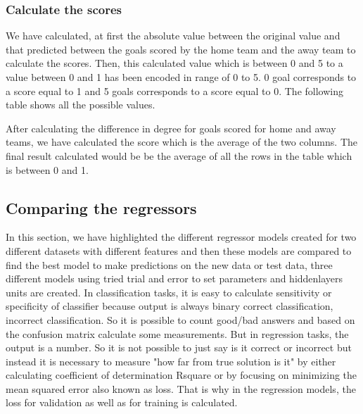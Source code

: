 \subsubsection{Calculate the scores}

We have calculated, at first the absolute value between the original value 
and that predicted between the goals scored by the home team and the away team to calculate the scores.
Then, this calculated value which is between 0 and 5 to a value between 0 and 1 has been encoded in range of 0 to 5. 
0 goal corresponds to a score equal to 1 and 5 goals corresponds to a score equal to 0.
The following table shows all the possible values.


\begin{table}[H]
    \centering
    \caption{Calculate the degree difference}
    \label{table:degreedifferencecalculate}
\end{table}

After calculating the difference in degree for goals scored for home and away teams, we have calculated the score which is the average of the two columns. The final result calculated would be be the average of all the rows in the table which is between 0 and 1.

\subsection{Comparing the regressors}
In this section, we have highlighted the different regressor models created for two different datasets with different features and then these models are compared to find the best model to make predictions on the new data or test data, three different models using tried trial and error to set parameters and hiddenlayers units are created.\newline 
In classification tasks, it is easy to calculate sensitivity or specificity of classifier because output is always binary {correct classification, incorrect classification}. So it is possible to count good/bad answers and based on the confusion matrix calculate some measurements. But in regression tasks, the output is a number. So it is not possible to just say is it correct or incorrect but instead it is necessary to measure "how far from true solution is it" by either calculating coefficient of determination Rsquare or by focusing on minimizing the mean squared error also known as loss. That is why in the regression models, the loss for validation as well as for training is calculated.
